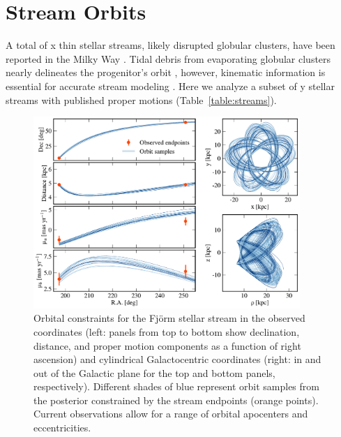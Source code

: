 \documentclass[twocolumn]{aastex63}
\newcommand{\package}[1]{\textsl{#1}}
\begin{document}
\section{Stream Orbits}
\label{sec:orbits}
A total of x thin stellar streams, likely disrupted globular clusters, have been reported in the Milky Way \citep[an up-to-date list is available in the \package{galstreams} package,][]{mateu:2018}.
Tidal debris from evaporating globular clusters nearly delineates the progenitor's orbit \citep[e.g.,][]{kupper:2012}, however, kinematic information is essential for accurate stream modeling \citep{bh:2018}.
Here we analyze a subset of y stellar streams with published proper motions (Table~\ref{table:streams}).

\begin{figure}
\begin{center}
\includegraphics[width=0.9\textwidth]{figures/stream_fitting.pdf}
\end{center}
\caption{Orbital constraints for the Fj\"{o}rm stellar stream in the observed coordinates (left: panels from top to bottom show declination, distance, and proper motion components as a function of right ascension) and cylindrical Galactocentric coordinates (right: in and out of the Galactic plane for the top and bottom panels, respectively).
Different shades of blue represent orbit samples from the posterior constrained by the stream endpoints (orange points).
Current observations allow for a range of orbital apocenters and eccentricities.
}
\label{fig:streams}
\end{figure}
\end{document}
